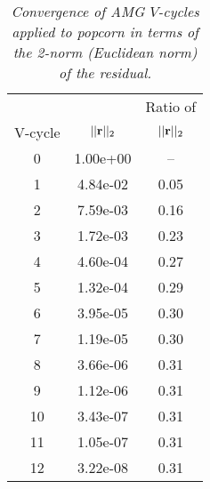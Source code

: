 \medskip
\begin{table}
\begin{center}
\begin{tabular}{ccc}\hline
          &                & Ratio of    \\
V-cycle &  $||{\bf r}||_2$ & $||{\bf r}||_2$\\\hline
   0 &  1.00e+00 &    --  \\
   1 &  4.84e-02 &   0.05 \\
   2 &  7.59e-03 &   0.16 \\
   3 &  1.72e-03 &   0.23 \\
   4 &  4.60e-04 &   0.27 \\
   5 &  1.32e-04 &   0.29 \\
   6 &  3.95e-05 &   0.30 \\
   7 &  1.19e-05 &   0.30 \\
   8 &  3.66e-06 &   0.31 \\
   9 &  1.12e-06 &   0.31 \\
  10 &  3.43e-07 &   0.31 \\
  11 &  1.05e-07 &   0.31 \\
  12 &  3.22e-08 &   0.31 \\\hline
\end{tabular}
\end{center}
\caption{\label{table:t4}{\em Convergence of AMG $V$-cycles
applied to popcorn in terms of the 2-norm (Euclidean norm) of the
residual.}}
\end{table}
